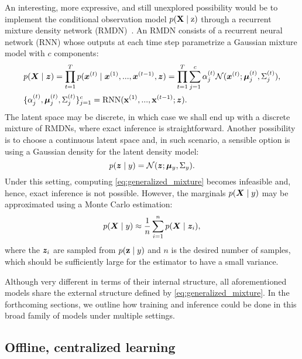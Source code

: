 An interesting, more expressive, and still unexplored possibility would be to implement the conditional observation model $p({\mathbf{X}} \mid {\textnormal{z}})$ through a recurrent mixture density network (RMDN)~\cite{Bishop1994, Graves2013, Bazzani2016}. An RMDN consists of a recurrent neural network (RNN) whose outputs at each time step parametrize a Gaussian mixture model with $c$ components:
\begin{align}
& p({\bm{X}} \mid {\bm{z}}) = \prod_{t=1}^T p({\bm{x}}^{(t)} \mid {\bm{x}}^{(1)}, ..., {\bm{x}}^{(t-1)}, {\bm{z}}) = \prod_{t=1}^T \sum_{j=1}^c \alpha_j^{(t)} \mathcal{N}({\bm{x}}^{(t)} ; {\bm{\mu}}_j^{(t)}, \Sigma_j^{(t)}),\\
& \lbrace \alpha_j^{(t)}, {\bm{\mu}}_j^{(t)}, \Sigma_j^{(t)} \rbrace_{j=1}^c = \text{RNN}({\mathbf{x}}^{(1)}, ..., {\mathbf{x}}^{(t-1)}; {\bm{z}}).
\end{align}
The latent space may be discrete, in which case we shall end up with a discrete mixture of RMDNs, where exact inference is straightforward. Another possibility is to choose a continuous latent space and, in such scenario, a sensible option is using a Gaussian density for the latent density model:
\begin{equation}
p({\bm{z}} \mid y) = \mathcal{N}({\bm{z}} ; {\bm{\mu}}_y, \Sigma_y).
\end{equation}
Under this setting, computing \eqref{eq:generalized_mixture} becomes infeasible and, hence, exact inference is not possible. However, the marginals $p({\bm{X}} \mid y)$ may be approximated using a Monte Carlo estimation:
\begin{equation}
p({\bm{X}} \mid y) \approx \frac{1}{n}\sum_{i=1}^n p({\bm{X}} \mid {\bm{z}}_i),
\end{equation}
where the ${\bm{z}}_i$ are sampled from $p({\mathbf{z}} \mid y)$ and $n$ is the desired number of samples, which should be sufficiently large for the estimator to have a small variance.

Although very different in terms of their internal structure, all aforementioned models share the external structure defined by \eqref{eq:generalized_mixture}. In the forthcoming sections, we outline how training and inference could be done in this broad family of models under multiple settings.

\subsection{Offline, centralized learning}
\label{sec:offline_learning}

